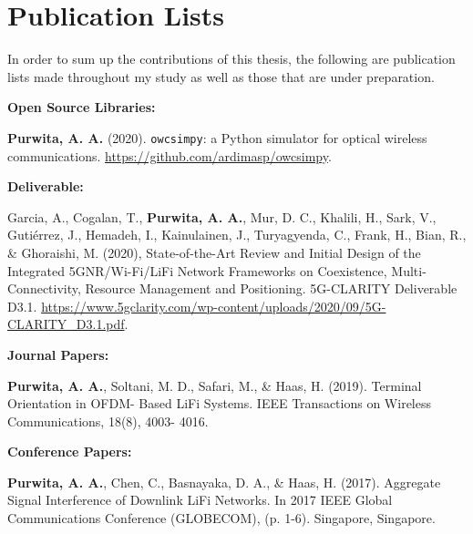 \section{Publication Lists}

    In order to sum up the contributions of this thesis, the following are publication lists made throughout my study as well as those that are under preparation.

    \textbf{Open Source Libraries:}
    \begin{enumerate}[label={[\arabic*]}]
        \vspace{-1em}
        \setlength\itemsep{-0.5em}
        \item \textbf{Purwita, A. A.} (2020). \texttt{owcsimpy}: a Python simulator for optical wireless communications. \url{https://github.com/ardimasp/owcsimpy}.
    \end{enumerate}
    
    \textbf{Deliverable:}
    \begin{enumerate}[label={[\arabic*]}]
        \vspace{-1em}
        \setlength\itemsep{-0.5em}
        \item Garcia, A., Cogalan, T., \textbf{Purwita, A. A.}, Mur, D. C., Khalili, H., Sark, V., Gutiérrez, J., Hemadeh, I., Kainulainen, J., Turyagyenda, C., Frank, H., Bian, R., \& Ghoraishi, M. (2020), State-of-the-Art Review and Initial Design of the Integrated 5GNR/Wi-Fi/LiFi Network Frameworks on Coexistence, Multi-Connectivity, Resource Management and Positioning. 5G-CLARITY Deliverable D3.1. \url{https://www.5gclarity.com/wp-content/uploads/2020/09/5G-CLARITY_D3.1.pdf}.
    \end{enumerate}



    \textbf{Journal Papers:}
    \begin{enumerate}[label={[\arabic*]}]
        \vspace{-1em}
        \setlength\itemsep{-0.5em}
        \item \textbf{Purwita, A. A.}, Soltani, M. D., Safari, M., \& Haas, H. (2019). Terminal Orientation in OFDM- Based LiFi Systems. IEEE Transactions on Wireless Communications, 18(8), 4003- 4016.
    \end{enumerate}

    \textbf{Conference Papers:}
    \begin{enumerate}[label={[\arabic*]}]
        \vspace{-1em}
        \setlength\itemsep{-0.5em}
        \item \textbf{Purwita, A. A.}, Chen, C., Basnayaka, D. A., \& Haas, H. (2017). Aggregate Signal Interference of Downlink LiFi Networks. In 2017 IEEE Global Communications Conference (GLOBECOM), (p. 1-6). Singapore, Singapore.
    \end{enumerate}

